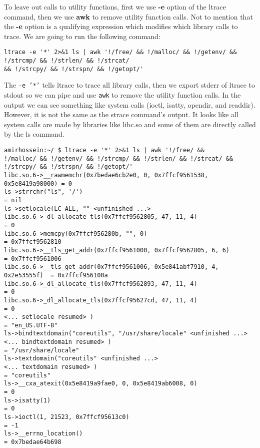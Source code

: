 \documentclass[12pt]{article}
\begin{document}
To leave out calls to utility functions, first we use \textbf{-e} option of the ltrace command, then we use \textbf{awk} to remove utility function calls. Not to mention that the \textbf{-e} option is a qualifying expression which modifies which library calls to trace. We are going to run the following command:

{\fontsize{8pt}{10pt}\selectfont
\begin{verbatim}
ltrace -e '*' 2>&1 ls | awk '!/free/ && !/malloc/ && !/getenv/ && !/strcmp/ && !/strlen/ && !/strcat/
&& !/strcpy/ && !/strspn/ && !/getopt/'
\end{verbatim}
}

The \texttt{-e '*'} tells ltrace to trace all library calls, then we export stderr of ltrace to stdout so we can pipe and use \texttt{awk} to remove the utility function calls. In the output we can see something like system calls (ioctl, isatty, opendir, and readdir). However, it is not the same as the strace command's output. It looks like all system calls are made by libraries like libc.so and some of them are directly called by the ls command.

{\fontsize{8pt}{10pt}\selectfont
\begin{verbatim}
amirhossein:~/ $ ltrace -e '*' 2>&1 ls | awk '!/free/ &&
!/malloc/ && !/getenv/ && !/strcmp/ && !/strlen/ && !/strcat/ && !/strcpy/ && !/strspn/ && !/getopt/'
libc.so.6->__rawmemchr(0x7bedae6cb2e0, 0, 0x7ffcf9561538, 0x5e8419a98000) = 0
ls->strrchr("ls", '/')                                                    = nil
ls->setlocale(LC_ALL, "" <unfinished ...>
libc.so.6->_dl_allocate_tls(0x7ffcf9562805, 47, 11, 4)                    = 0
libc.so.6->memcpy(0x7ffcf956280b, "", 0)                                  = 0x7ffcf9562810
libc.so.6->__tls_get_addr(0x7ffcf9561000, 0x7ffcf9562805, 6, 6)           = 0x7ffcf9561006
libc.so.6->__tls_get_addr(0x7ffcf9561006, 0x5e841abf7910, 4, 0x2e53555f)  = 0x7ffcf956100a
libc.so.6->_dl_allocate_tls(0x7ffcf9562893, 47, 11, 4)                    = 0
libc.so.6->_dl_allocate_tls(0x7ffcf95627cd, 47, 11, 4)                    = 0
<... setlocale resumed> )                                                 = "en_US.UTF-8"
ls->bindtextdomain("coreutils", "/usr/share/locale" <unfinished ...>
<... bindtextdomain resumed> )                                            = "/usr/share/locale"
ls->textdomain("coreutils" <unfinished ...>
<... textdomain resumed> )                                                = "coreutils"
ls->__cxa_atexit(0x5e8419a9fae0, 0, 0x5e8419ab6008, 0)                    = 0
ls->isatty(1)                                                             = 0
ls->ioctl(1, 21523, 0x7ffcf95613c0)                                       = -1
ls->__errno_location()                                                    = 0x7bedae64b698
\end{verbatim}
}
\end{document}
